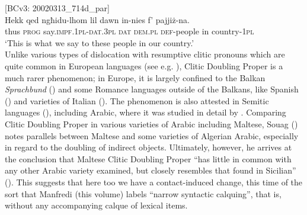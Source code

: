 \documentclass[output=paper]{langsci/langscibook}
\begin{document}
\z
\ea\label{cdp02} 
{[BCv3: 20020313\_714d\_par]}\\
\gll Hekk qed ngħidu-lhom lil dawn in-nies f' pajjiż-na.\\
	thus \textsc{prog} say.\textsc{impf.1pl}-\textsc{dat.3pl} \textsc{dat} \textsc{dem.pl} \textsc{def}-people in country-\textsc{1pl}\\
	\glt `This is what we say to these people in our country.'\\
\z
Unlike various types of dislocation with resumptive clitic pronouns which are quite common in European languages (see e.g. \citealt{Decat2010}), Clitic Doubling Proper is a much rarer phenomenon; in Europe, it is largely confined to the Balkan \textit{Sprachbund} (\citealt{Friedman2008}) and some Romance languages outside of the Balkans, like Spanish (\citealt[7]{Zagona2002}) and varieties of Italian (\citealt[231--233]{Russi2008}). The phenomenon is also attested in Semitic languages (\citealt{Khan1984}), including Arabic, where it was studied in detail by \cite{Souag2017clitic}. Comparing Clitic Doubling Proper in various varieties of Arabic including Maltese, Souag (\citeyear[57]{Souag2017clitic}) notes parallels between Maltese and some varieties of Algerian Arabic, especially in regard to the doubling of indirect objects. Ultimately, however, he arrives at the conclusion that Maltese Clitic Doubling Proper ``has little in common with any other Arabic variety examined, but closely resembles that found in Sicilian'' (\citealt[60]{Souag2017clitic}). This suggests that here too we have a contact-induced change, this time of the sort that Manfredi (this volume) labels ``narrow syntactic calquing'', that is, without any accompanying calque of lexical items.
\end{document}
